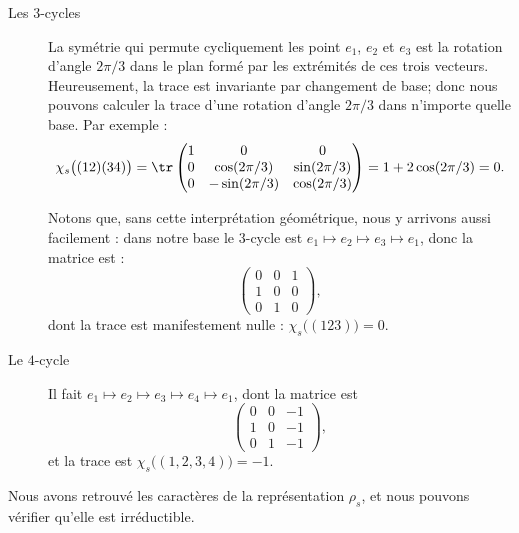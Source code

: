 \begin{description}
    \item[Les \( 3\)-cycles]
        
        La symétrie qui permute cycliquement les point \( e_1\), \( e_2\) et \( e_3\) est la rotation d'angle \( 2\pi/3\) dans le plan formé par les extrémités de ces trois vecteurs. Heureusement, la trace est invariante par changement de base; donc nous pouvons calculer la trace d'une rotation d'angle \( 2\pi/3\) dans n'importe quelle base. Par exemple :
        \begin{equation}
            \chi_s\big( (12)(34) \big)=\tr\begin{pmatrix}
                1    &   0    &   0    \\
                0    &   \cos(2\pi/3)    &   \sin(2\pi/3)    \\
                0    &   -\sin(2\pi/3)    &   \cos(2\pi/3)
            \end{pmatrix}=1+2\cos(2\pi/3)=0.
        \end{equation}
        
        Notons que, sans cette interprétation géométrique, nous y arrivons aussi facilement : dans notre base le \( 3\)-cycle est \( e_1\mapsto e_2\mapsto e_3\mapsto e_1\), donc la matrice est :
        \begin{equation}
            \begin{pmatrix}
                0    &   0    &   1    \\
                1    &   0    &   0    \\
                0    &   1    &   0
            \end{pmatrix},
        \end{equation}
        dont la trace est manifestement nulle : \( \chi_s\big( (123) \big)=0\).

    \item[Le \( 4\)-cycle]

        Il fait \( e_1\mapsto e_2\mapsto e_3\mapsto e_4\mapsto e_1\), dont la matrice est
        \begin{equation}        \label{EQooONDUooYlduup}
            \begin{pmatrix}
                0    &   0    &   -1    \\
                1    &   0    &   -1    \\
                0    &   1    &   -1
            \end{pmatrix},
        \end{equation}
        et la trace est \( \chi_s\big( (1,2,3,4) \big)=-1\).
\end{description}
Nous avons retrouvé les caractères de la représentation \( \rho_s\), et nous pouvons vérifier qu'elle est irréductible.

